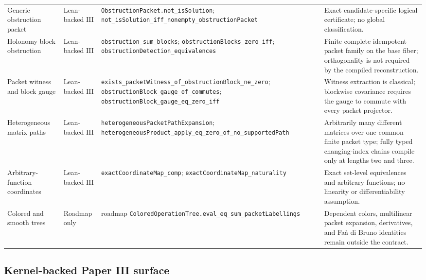 \documentclass[11pt,a4paper]{article}
\theoremstyle{plain}
\theoremstyle{definition}
\theoremstyle{remark}
\newcommand{\leanname}[1]{\nolinkurl{#1}}
\begin{document}
\begin{longtable}{L{0.17\textwidth}L{0.18\textwidth}L{0.25\textwidth}L{0.22\textwidth}}
\addlinespace
Generic obstruction packet
& Lean-backed III
& \leanname{ObstructionPacket.not_isSolution}; \leanname{not_isSolution_iff_nonempty_obstructionPacket}
& Exact candidate-specific logical certificate; no global classification.\\
\addlinespace
Holonomy block obstruction
& Lean-backed III
& \leanname{obstruction_sum_blocks}; \leanname{obstructionBlocks_zero_iff}; \leanname{obstructionDetection_equivalences}
& Finite complete idempotent packet family on the base fiber; orthogonality is not required by the compiled reconstruction.\\
\addlinespace
Packet witness and block gauge
& Lean-backed III
& \leanname{exists_packetWitness_of_obstructionBlock_ne_zero}; \leanname{obstructionBlock_gauge_of_commutes}; \leanname{obstructionBlock_gauge_eq_zero_iff}
& Witness extraction is classical; blockwise covariance requires the gauge to commute with every packet projector.\\
\addlinespace
Heterogeneous matrix paths
& Lean-backed III
& \leanname{heterogeneousPacketPathExpansion}; \leanname{heterogeneousProduct_apply_eq_zero_of_no_supportedPath}
& Arbitrarily many different matrices over one common finite packet type; fully typed changing-index chains compile only at lengths two and three.\\
\addlinespace
Arbitrary-function coordinates
& Lean-backed III
& \leanname{exactCoordinateMap_comp}; \leanname{exactCoordinateMap_naturality}
& Exact set-level equivalences and arbitrary functions; no linearity or differentiability assumption.\\
\addlinespace
Colored and smooth trees
& Roadmap only
& roadmap \leanname{ColoredOperationTree.eval_eq_sum_packetLabellings}
& Dependent colors, multilinear packet expansion, derivatives, and Fa\`a di Bruno identities remain outside the contract.\\
\bottomrule
\end{longtable}
\normalsize

\subsection{Kernel-backed Paper III surface}
\end{document}
